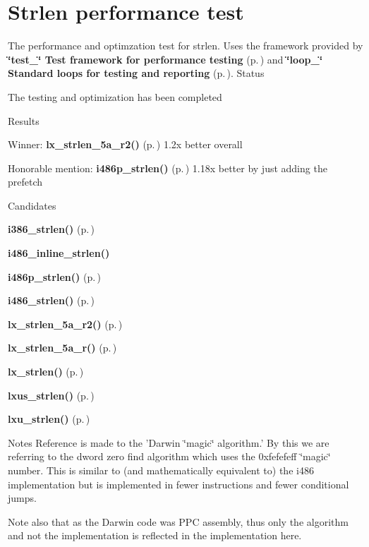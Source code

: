 \section{Strlen performance test}
\label{group__strlen__test}
The performance and optimzation test for strlen. Uses the framework provided by {\bf \char`\"{}test\_\-\char`\"{} Test framework for performance testing} {\rm (p.\,\pageref{group__test})} and {\bf \char`\"{}loop\_\-\char`\"{} Standard loops for testing and reporting} {\rm (p.\,\pageref{group__loop__test})}. 
Status

The testing and optimization has been completed

Results

\begin{CompactItemize}
\item 
Winner: {\bf lx\_\-strlen\_\-5a\_\-r2()} {\rm (p.\,\pageref{strlen_2def__test_8h_a5})} 1.2x better overall\item 
Honorable mention: {\bf i486p\_\-strlen()} {\rm (p.\,\pageref{strlen_2def__test_8h_a3})} 1.18x better by just adding the prefetch\end{CompactItemize}
Candidates

\begin{CompactItemize}
\item 
{\bf i386\_\-strlen()} {\rm (p.\,\pageref{strlen_2def__test_8h_a1})}\item 
{\bf i486\_\-inline\_\-strlen()}\item 
{\bf i486p\_\-strlen()} {\rm (p.\,\pageref{strlen_2def__test_8h_a3})}\item 
{\bf i486\_\-strlen()} {\rm (p.\,\pageref{strlen_2def__test_8h_a4})}\item 
{\bf lx\_\-strlen\_\-5a\_\-r2()} {\rm (p.\,\pageref{strlen_2def__test_8h_a5})}\item 
{\bf lx\_\-strlen\_\-5a\_\-r()} {\rm (p.\,\pageref{strlen_2def__test_8h_a6})}\item 
{\bf lx\_\-strlen()} {\rm (p.\,\pageref{strlen_2def__test_8h_a7})}\item 
{\bf lxus\_\-strlen()} {\rm (p.\,\pageref{strlen_2def__test_8h_a8})}\item 
{\bf lxu\_\-strlen()} {\rm (p.\,\pageref{strlen_2def__test_8h_a9})}\end{CompactItemize}
Notes Reference is made to the 'Darwin \char`\"{}magic\char`\"{} algorithm.' By this we are referring to the dword zero find algorithm which uses the 0xfefefeff \char`\"{}magic\char`\"{} number. This is similar to (and mathematically equivalent to) the i486 implementation but is implemented in fewer instructions and fewer conditional jumps.

Note also that as the Darwin code was PPC assembly, thus only the algorithm and not the implementation is reflected in the implementation here. 